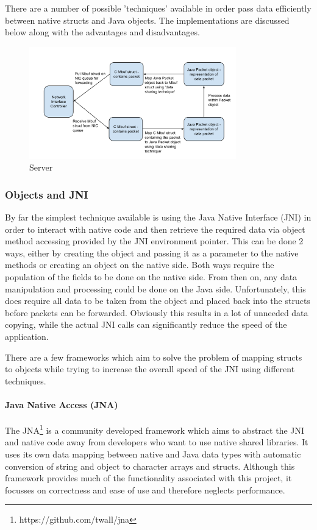 \documentclass[final_report.tex]{subfiles}
\begin{document}
There are a number of possible 'techniques' available in order pass data efficiently between native structs and Java objects. The implementations are discussed below along with the advantages and disadvantages.

\begin{figure}[H]
	\centering
	\includegraphics[width=0.8\textwidth]{img/pipeline.png}
	\caption{Server}
	\label{fig:pipeline}
\end{figure}

\subsubsection{Objects and JNI}
By far the simplest technique available is using the Java Native Interface (JNI) in order to interact with native code and then retrieve the required data via object method accessing provided by the JNI environment pointer. This can be done 2 ways, either by creating the object and passing it as a parameter to the native methods or creating an object on the native side. Both ways require the population of the fields to be done on the native side. From then on, any data manipulation and processing could be done on the Java side. Unfortunately, this does require all data to be taken from the object and placed back into the structs before packets can be forwarded. Obviously this results in a lot of unneeded data copying, while the actual JNI calls can significantly reduce the speed of the application.

There are a few frameworks which aim to solve the problem of mapping structs to objects while trying to increase the overall speed of the JNI using different techniques.

\paragraph*{Java Native Access (JNA)}
The JNA\footnote{https://github.com/twall/jna} is a community developed framework which aims to abstract the JNI and native code away from developers who want to use native shared libraries. It uses its own data mapping between native and Java data types with automatic conversion of string and object to character arrays and structs. Although this framework provides much of the functionality associated with this project, it focusses on correctness and ease of use and therefore neglects performance.
\end{document}
